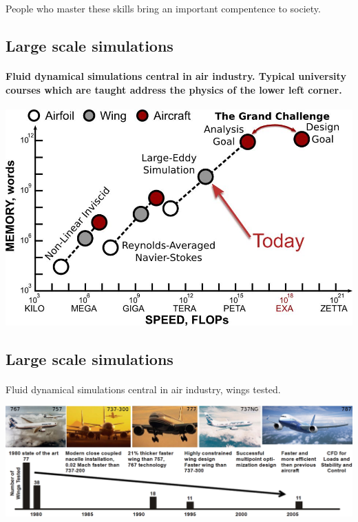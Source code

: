 \documentclass[%
twoside,                 %
final,                   %
10pt]{article}
\begin{document}
\noindent
People who master these skills bring an important compentence to society.



\subsection{Large scale simulations}

\paragraph{Fluid dynamical simulations central in air industry.  Typical university courses which are taught address the physics of the lower left corner.}


\centerline{\includegraphics[width=0.6\linewidth]{figures/fig10.jpg}}




\subsection{Large scale simulations}

\paragraph{}
Fluid dynamical simulations central in air industry, wings tested.


\centerline{\includegraphics[width=1.0\linewidth]{figures/fig8.jpg}}
\end{document}
